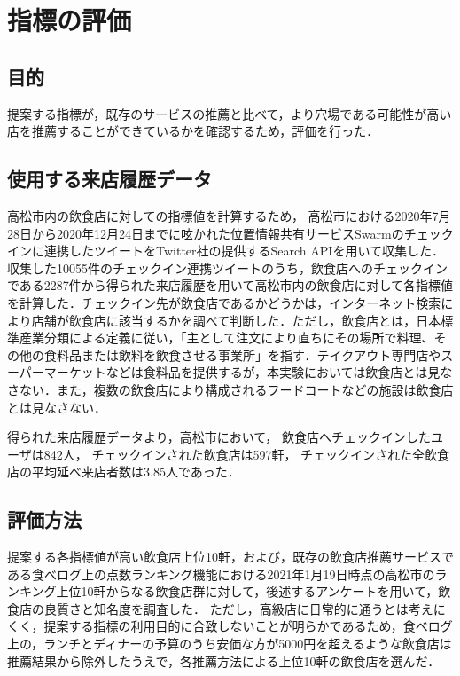 \chapter{指標の評価}



\label{chap:experiment}

\section{目的}
提案する指標が，既存のサービスの推薦と比べて，より穴場である可能性が高い店を推薦することができているかを確認するため，評価を行った．

\section{使用する来店履歴データ}
高松市内の飲食店に対しての指標値を計算するため，
高松市における2020年7月28日から2020年12月24日までに呟かれた位置情報共有サービスSwarmのチェックインに連携したツイートをTwitter社の提供するSearch APIを用いて収集した．収集した10055件のチェックイン連携ツイートのうち，飲食店へのチェックインである2287件から得られた来店履歴を用いて高松市内の飲食店に対して各指標値を計算した．チェックイン先が飲食店であるかどうかは，インターネット検索により店舗が飲食店に該当するかを調べて判断した．ただし，飲食店とは，日本標準産業分類による定義\cite{restaurant}に従い，「主として注文により直ちにその場所で料理、その他の食料品または飲料を飲食させる事業所」を指す．テイクアウト専門店やスーパーマーケットなどは食料品を提供するが，本実験においては飲食店とは見なさない．また，複数の飲食店により構成されるフードコートなどの施設は飲食店とは見なさない．\par
得られた来店履歴データより，高松市において，
飲食店へチェックインしたユーザは842人，
チェックインされた飲食店は597軒，
チェックインされた全飲食店の平均延べ来店者数は3.85人であった．

\section{評価方法}
提案する各指標値が高い飲食店上位10軒，および，既存の飲食店推薦サービスである食べログ上の点数ランキング機能における2021年1月19日時点の高松市のランキング上位10軒からなる飲食店群に対して，後述するアンケートを用いて，飲食店の良質さと知名度を調査した．
ただし，高級店に日常的に通うとは考えにくく，提案する指標の利用目的に合致しないことが明らかであるため，食べログ上の，ランチとディナーの予算のうち安価な方が5000円を超えるような飲食店は推薦結果から除外したうえで，各推薦方法による上位10軒の飲食店を選んだ．

